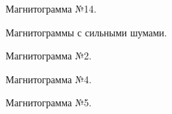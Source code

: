 \documentclass[a4paper,article,14pt]{extarticle}
\begin{document}
\begin{figure}[h!]
\begin{minipage}[h]{0.9\linewidth}
    \end{minipage}
    \vfill
    \begin{minipage}[h]{0.9\linewidth}
     Магнитограмма №14. \\
    \end{minipage}
    \caption{Магнитограммы с сильными шумами.}
    \label{image5}
\end{figure}

\pagebreak

\begin{figure}[h!]
    \begin{minipage}[h]{0.9\linewidth}
     Магнитограмма №2. \\
    \end{minipage}
    \vfill
    \begin{minipage}[h]{0.9\linewidth}
     Магнитограмма №4. \\
    \end{minipage}
    \vfill
    \begin{minipage}[h]{0.9\linewidth}
     Магнитограмма №5. \\

\end{minipage}
\end{figure}
\end{document}

